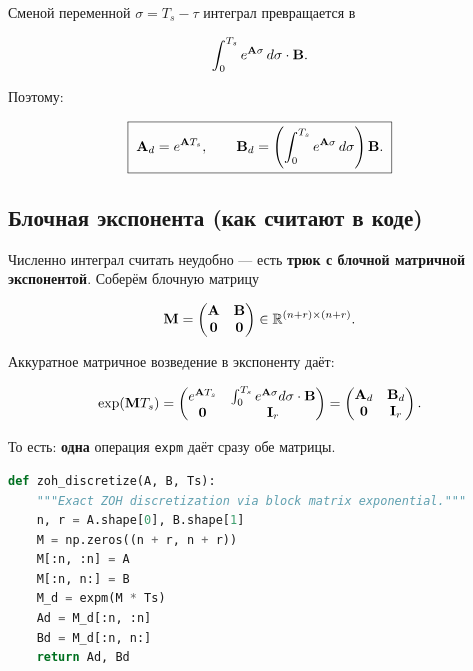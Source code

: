 Сменой переменной $\sigma = T_s - \tau$ интеграл превращается в

\[
  \int_0^{T_s} e^{\mathbf{A}\sigma}\,d\sigma \cdot \mathbf{B}.
\]

Поэтому:

\begin{formulabox}[title={ZOH-дискретизация}]
\begin{equation}
  \boxed{\;
    \mathbf{A}_d = e^{\mathbf{A} T_s},
    \qquad
    \mathbf{B}_d = \left(\int_0^{T_s} e^{\mathbf{A}\sigma}\,d\sigma\right) \mathbf{B}.
    \;}
  \label{eq:zoh}
\end{equation}
\end{formulabox}

\subsection{Блочная экспонента (как считают в коде)}

Численно интеграл считать неудобно --- есть \textbf{трюк с блочной
матричной экспонентой}. Соберём блочную матрицу

\[
  \mathbf{M} =
  \begin{pmatrix}
    \mathbf{A} & \mathbf{B} \\
    \mathbf{0} & \mathbf{0}
  \end{pmatrix} \in \mathbb{R}^{(n+r) \times (n+r)}.
\]

Аккуратное матричное возведение в экспоненту даёт:

\begin{equation}
  \exp(\mathbf{M} T_s) =
  \begin{pmatrix}
    e^{\mathbf{A} T_s} & \int_0^{T_s} e^{\mathbf{A}\sigma}d\sigma \cdot \mathbf{B} \\
    \mathbf{0}         & \mathbf{I}_r
  \end{pmatrix}
  =
  \begin{pmatrix}
    \mathbf{A}_d & \mathbf{B}_d \\
    \mathbf{0}   & \mathbf{I}_r
  \end{pmatrix}.
  \label{eq:block_exp}
\end{equation}

То есть: \textbf{одна} операция \texttt{expm} даёт сразу обе матрицы.

\begin{codebox}[title={\filepath{pi\_nodes/control/state\_space\_model.py:48}}]
\begin{lstlisting}[language=Python]
def zoh_discretize(A, B, Ts):
    """Exact ZOH discretization via block matrix exponential."""
    n, r = A.shape[0], B.shape[1]
    M = np.zeros((n + r, n + r))
    M[:n, :n] = A
    M[:n, n:] = B
    M_d = expm(M * Ts)
    Ad = M_d[:n, :n]
    Bd = M_d[:n, n:]
    return Ad, Bd
\end{lstlisting}
\end{codebox}

